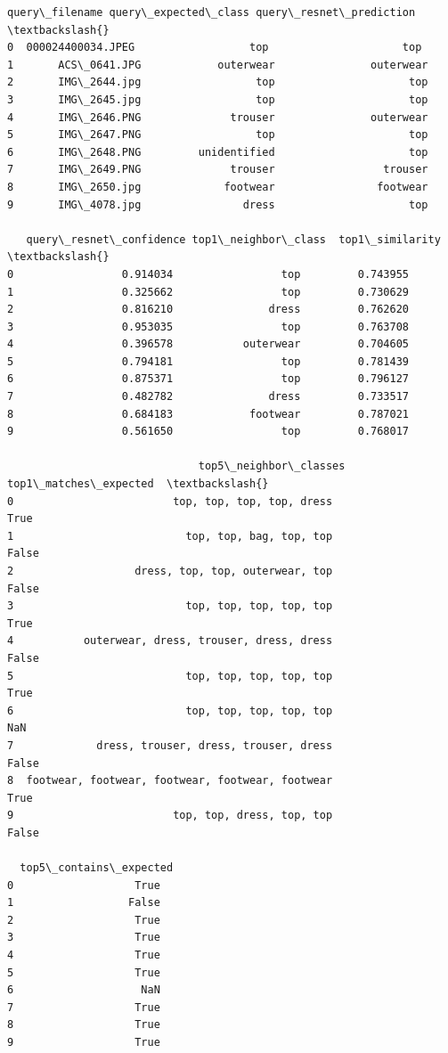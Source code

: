 \documentclass[11pt]{article}
\begin{document}
    
    \begin{Verbatim}[commandchars=\\\{\}]
      query\_filename query\_expected\_class query\_resnet\_prediction  \textbackslash{}
0  000024400034.JPEG                  top                     top   
1       ACS\_0641.JPG            outerwear               outerwear   
2       IMG\_2644.jpg                  top                     top   
3       IMG\_2645.jpg                  top                     top   
4       IMG\_2646.PNG              trouser               outerwear   
5       IMG\_2647.PNG                  top                     top   
6       IMG\_2648.PNG         unidentified                     top   
7       IMG\_2649.PNG              trouser                 trouser   
8       IMG\_2650.jpg             footwear                footwear   
9       IMG\_4078.jpg                dress                     top   

   query\_resnet\_confidence top1\_neighbor\_class  top1\_similarity  \textbackslash{}
0                 0.914034                 top         0.743955   
1                 0.325662                 top         0.730629   
2                 0.816210               dress         0.762620   
3                 0.953035                 top         0.763708   
4                 0.396578           outerwear         0.704605   
5                 0.794181                 top         0.781439   
6                 0.875371                 top         0.796127   
7                 0.482782               dress         0.733517   
8                 0.684183            footwear         0.787021   
9                 0.561650                 top         0.768017   

                              top5\_neighbor\_classes top1\_matches\_expected  \textbackslash{}
0                         top, top, top, top, dress                  True   
1                           top, top, bag, top, top                 False   
2                   dress, top, top, outerwear, top                 False   
3                           top, top, top, top, top                  True   
4           outerwear, dress, trouser, dress, dress                 False   
5                           top, top, top, top, top                  True   
6                           top, top, top, top, top                   NaN   
7             dress, trouser, dress, trouser, dress                 False   
8  footwear, footwear, footwear, footwear, footwear                  True   
9                         top, top, dress, top, top                 False   

  top5\_contains\_expected  
0                   True  
1                  False  
2                   True  
3                   True  
4                   True  
5                   True  
6                    NaN  
7                   True  
8                   True  
9                   True  
    \end{Verbatim}
\end{document}
